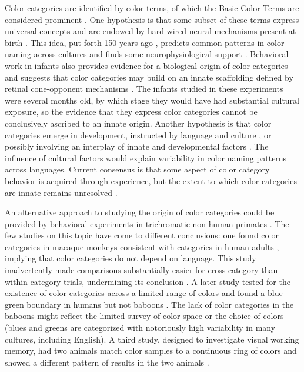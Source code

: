 Color categories are identified by color terms, of which the Basic Color Terms are considered prominent \citep{berlin_basic_1969}.
One hypothesis is that some subset of these terms express universal concepts \citep{heider_universals_1972,regier_focal_2005}
and are endowed by hard-wired neural mechanisms present at birth \citep{bornstein_categories_1976,lindsey_universality_2006}. 
This idea, put forth 150 years ago \citep{hering_zur_1875}, predicts common patterns in color naming across cultures \citep{baronchelli_modeling_2010,lindsey_hunter-gatherer_2015,abbott_focal_2016}
and finds some neurophysiological support \citep{clifford_electrophysiological_2009,yang_cortical_2016}. 
Behavioral work in infants also provides evidence for a biological origin of color categories \citep{franklin_new_2004,ozturk_language_2013} and suggests that color categories may build on an innate scaffolding defined by retinal cone-opponent mechanisms \citep{skelton_biological_2017}.
The infants studied in these experiments were several months old, by which stage they would have had substantial cultural exposure, so the evidence that they express color categories cannot be conclusively ascribed to an innate origin. Another hypothesis is that color categories emerge in development, instructed by language and culture \citep{davidoff_colour_1999,roberson_color_2005}, or possibly involving an interplay of innate and developmental factors \citep{webster_variations_2002,kay_language_2006,franklin_lateralization_2008,regier_language_2009,paramei_online_2018}. The influence of cultural factors would explain variability in color naming patterns across languages. Current consensus is that some aspect of color category behavior is acquired through experience, but the extent to which color categories are innate remains unresolved \citep{davidoff_nature_2009,RN18696}.

An alternative approach to studying the origin of color categories could be provided by behavioral experiments in trichromatic non-human primates \citep{siuda-krzywicka_biological_2019}. 
The few studies on this topic have come to different conclusions: one found color categories in macaque monkeys consistent with categories in human adults \citep{sandell_color_1979}, implying that color categories do not depend on language.
This study inadvertently made comparisons substantially easier for cross-category than within-category trials, undermining its conclusion \citep{davidoff_cross-species_2010}. 
A later study tested for the existence of color categories across a limited range of colors and found a blue-green boundary in humans but not baboons \citep{fagot_cross-species_2006}. The lack of color categories in the baboons might reflect the limited survey of color space or the choice of colors (blues and greens are categorized with notoriously high variability in many cultures, including English). A third study, designed to investigate visual working memory, had two animals match color samples to a continuous ring of colors and showed a different pattern of results in the two animals \citep{panichello_error-correcting_2019}.

